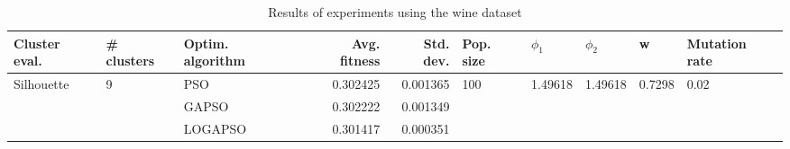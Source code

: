 \begin{table}
\centering
\caption{Results of experiments using the wine dataset}
\begin{tabular}{lllrrlllll}
\toprule
              Cluster eval. &        \# clusters & Optim. algorithm &  Avg. fitness &  Std. dev. &            Pop. size &               $\phi_{1}$ &               $\phi_{2}$ &                       w &         Mutation rate \\
\midrule
\multirow{3}{*}{Silhouette} & \multirow{3}{*}{9} &              PSO &      0.302425 &   0.001365 & \multirow{3}{*}{100} & \multirow{3}{*}{1.49618} & \multirow{3}{*}{1.49618} & \multirow{3}{*}{0.7298} & \multirow{3}{*}{0.02} \\
                            &                    &            GAPSO &      0.302222 &   0.001349 &                      &                          &                          &                         &                       \\
                            &                    &          LOGAPSO &      0.301417 &   0.000351 &                      &                          &                          &                         &                       \\
\bottomrule
\end{tabular}
\end{table}
